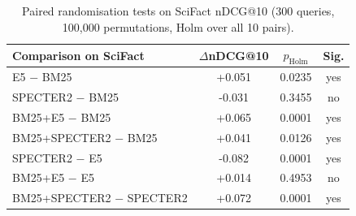 \begin{table}[t]
\centering
\small
\caption{Paired randomisation tests on SciFact nDCG@10 (300 queries, 100,000 permutations, Holm over all 10 pairs).}
\label{tab:scisig}
\begin{tabular}{lccc}
\toprule
Comparison on SciFact & $\Delta$nDCG@10 & $p_{\text{Holm}}$ & Sig. \\
\midrule
E5 $-$ BM25 & +0.051 & 0.0235 & yes \\
SPECTER2 $-$ BM25 & -0.031 & 0.3455 & no \\
BM25+E5 $-$ BM25 & +0.065 & 0.0001 & yes \\
BM25+SPECTER2 $-$ BM25 & +0.041 & 0.0126 & yes \\
SPECTER2 $-$ E5 & -0.082 & 0.0001 & yes \\
BM25+E5 $-$ E5 & +0.014 & 0.4953 & no \\
BM25+SPECTER2 $-$ SPECTER2 & +0.072 & 0.0001 & yes \\
\bottomrule
\end{tabular}
\end{table}
